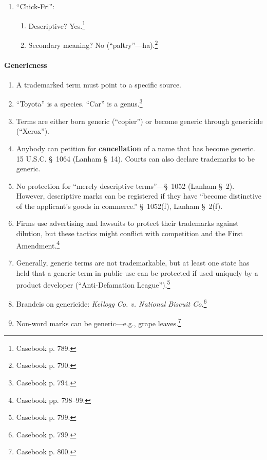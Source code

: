 \begin{enumerate}
\begin{enumerate}
        \begin{enumerate}
            \item Zatarain's cannot claim an exclusive right in the original, 
            descriptive sense of ``fish fry.'' So, its competitors are free to 
            use them in that sense.\footnote{Casebook p. 789.}
            \item Also, dissimilar trade dress would likely prevent consumer 
            confusion.
        \end{enumerate}
    \end{enumerate}
    \item ``Chick-Fri'':
    \begin{enumerate}
        \item Descriptive? Yes.\footnote{Casebook p. 789.}
        \item Secondary meaning? No (``paltry''---ha).\footnote{Casebook p. 
        790.}
    \end{enumerate}
\end{enumerate}

\paragraph{Genericness}

\begin{enumerate}
    \item A trademarked term must point to a specific source. 
    \item ``Toyota'' is a species. ``Car'' is a genus.\footnote{Casebook p. 
    794.}
    \item Terms are either born generic (``copier'') or become generic through 
    genericide (``Xerox'').
    \item Anybody can petition for \textbf{cancellation} of a name that has 
    become generic. 15 U.S.C. \S\ 1064 (Lanham \S\ 14). Courts can also 
    declare trademarks to be generic.
    \item No protection for ``merely descriptive terms''---\S\ 1052 (Lanham 
    \S\ 2). However, descriptive marks can be registered if they have ``become 
    distinctive of the applicant's goods in commerce.'' \S\ 1052(f), Lanham 
    \S\ 2(f).
    \item Firms use advertising and lawsuits to protect their trademarks 
    against dilution, but these tactics might conflict with competition and 
    the First Amendment.\footnote{Casebook pp. 798--99.}
    \item Generally, generic terms are not trademarkable, but at least one 
    state has held that a generic term in public use can be protected if used 
    uniquely by a product developer (``Anti-Defamation 
    League'').\footnote{Casebook p. 799.}
    \item Brandeis on genericide: \emph{Kellogg Co. v. National Biscuit 
    Co.}\footnote{Casebook p. 799.}
    \item Non-word marks can be generic---e.g., grape 
    leaves.\footnote{Casebook p. 800.}
\end{enumerate}

